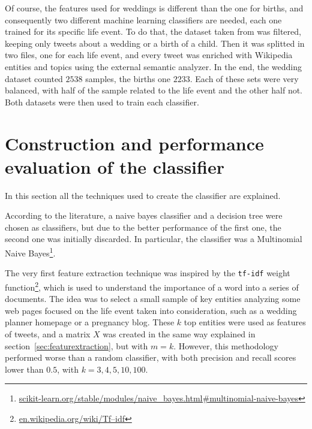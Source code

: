Of course, the features used for weddings is different than the one for births, and consequently two different machine learning classifiers are needed, each one trained for its specific life event. To do that, the dataset taken from \cite{dickinson2015identifying} was filtered, keeping only tweets about a wedding or a birth of a child. Then it was splitted in two files, one for each life event, and every tweet was enriched with Wikipedia entities and topics using the external semantic analyzer. In the end, the wedding dataset counted $2538$ samples, the births one $2233$. Each of these sets were very balanced, with half of the sample related to the life event and the other half not. Both datasets were then used to train each classifier.

\section{Construction and performance evaluation of the classifier}
In this section all the techniques used to create the classifier are explained.

 According to the literature, a naive bayes classifier and a decision tree were chosen as classifiers, but due to the better performance of the first one, the second one was initially discarded. In particular, the classifier was a Multinomial Naive Bayes\footnote{\url{scikit-learn.org/stable/modules/naive_bayes.html#multinomial-naive-bayes}}.

The very first feature extraction technique was inspired by the \texttt{tf-idf} weight function\footnote{\url{en.wikipedia.org/wiki/Tf–idf}}, which is used to understand the importance of a word into a series of documents. The idea was to select a small sample of key entities analyzing some web pages focused on the life event taken into consideration, such as a wedding planner homepage or a pregnancy blog. These $k$ top entities were used as features of tweets, and a matrix $X$ was created in the same way explained in section~\ref{sec:featurextraction}, but with $m = k$. However, this methodology performed worse than a random classifier, with both precision and recall scores lower than $0.5$, with $k = 3, 4, 5, 10, 100$.

